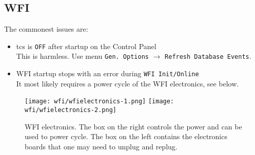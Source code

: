 \documentclass[11pt,fleqn]{book} %
\begin{document}
\subsection{WFI}

The commonest issues are:
\begin{itemize}
  \item \gls{tcs} is \texttt{OFF} after startup on the Control Panel\\
   This is harmless. Use menu \texttt{Gen. Options} $\rightarrow$ \texttt{Refresh Database Events}.
  \item WFI startup stops with an error during \texttt{WFI Init/Online}\\
       It most likely requires a power cycle of the WFI electronics, see below.
\end{itemize}

\begin{figure}[ht]
	\texttt{[image: wfi/wfielectronics-1.png]}
	\linewidth
	\texttt{[image: wfi/wfielectronics-2.png]}
	\caption{WFI electronics.  The box on the right controls the power and can be used to power cycle.
The box on the left contains the electronics boards that one may need to unplug and replug.}
	\label{fig:wfielectronics}
\end{figure}
\end{document}
